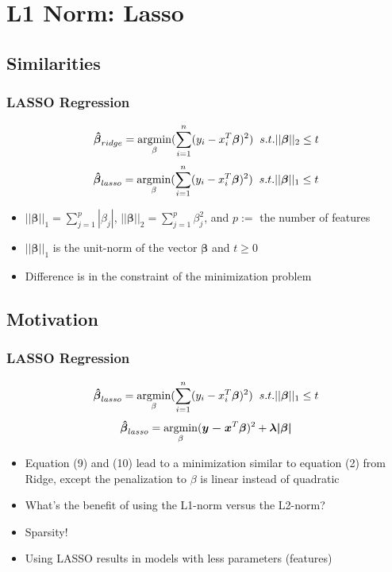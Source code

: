 \documentclass[]{beamer}
\newcommand{\argmin}{\operatornamewithlimits{argmin}}
\begin{document}
\section{L1 Norm: Lasso}
\subsection{Similarities}
\begin{frame}
\frametitle{LASSO Regression}   %
\begin{equation}
\boldsymbol{\hat{\beta}}_{ridge} = \argmin_{\beta}( \sum_{i=1}^{n} (y_i-x_{i}^T \boldsymbol{\beta})^2) \hspace{0.2cm} s.t. ||\boldsymbol{\beta}||_2 \le t
\end{equation}
\begin{equation}
\boldsymbol{\hat{\beta}}_{lasso} = \argmin_{\beta}( \sum_{i=1}^{n} (y_i-x_{i}^T \boldsymbol{\beta})^2) \hspace{0.2cm} s.t. ||\boldsymbol{\beta}||_1 \le t
\end{equation}
\begin{itemize}
\item<1-> $||\boldsymbol{\beta}||_1 = \sum_{j=1}^{p}|\beta_j|$, $||\boldsymbol{\beta}||_2 = \sum_{j=1}^{p}\beta_j^2$, and $p:=$ the number of features
\item<2-> $||\boldsymbol{\beta}||_1$ is the unit-norm of the vector $\boldsymbol{\beta}$ and $t \ge 0$ 
  \item<3-> Difference is in the constraint of the minimization problem
\end{itemize}
\end{frame}

\subsection{Motivation}
\begin{frame}
\frametitle{LASSO Regression}   %
\begin{equation}
\boldsymbol{\hat{\beta}}_{lasso} = \argmin_{\beta}( \sum_{i=1}^{n} (y_i-x_{i}^T \boldsymbol{\beta})^2) \hspace{0.2cm} s.t. ||\boldsymbol{\beta}||_1 \le t
\end{equation}
\begin{equation}
\boldsymbol{\hat{\beta}}_{lasso} = \argmin_{\beta} (\boldsymbol{y - x}^{T} \boldsymbol{\beta})^2 + \boldsymbol{\lambda |\beta|}
\end{equation}

\begin{itemize}
\item<1-> Equation (9) and (10) lead to a minimization similar to equation (2) from Ridge, except the penalization to $\beta$ is linear instead of quadratic
\item<2-> What's the benefit of using the L1-norm versus the L2-norm?
\item<3-> Sparsity!
\item<4-> Using LASSO results in models with less parameters (features)
\end{itemize}
\end{frame}
\end{document}
